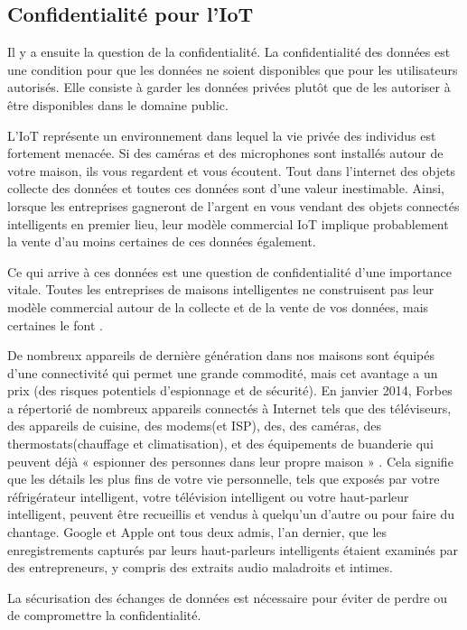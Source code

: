 \subsection{Conf{\kern0pt}identialité pour l’IoT}
Il y a ensuite la question de la conf{\kern0pt}identialité. La conf{\kern0pt}identialité des données est une condition pour que les données ne soient disponibles que pour les utilisateurs autorisés. Elle consiste à garder les données privées plutôt que de les autoriser à être disponibles dans le domaine public.


L’IoT représente un environnement dans lequel la vie privée des individus est fortement menacée. Si des caméras et des microphones sont installés autour de votre maison, ils vous regardent et vous écoutent. Tout dans l'internet des objets collecte des données et toutes ces données sont d’une valeur inestimable. Ainsi, lorsque les entreprises gagneront de l'argent en vous vendant des objets connectés intelligents en premier lieu, leur modèle commercial IoT implique probablement la vente d'au moins certaines de ces données également.


Ce qui arrive à ces données est une question de conf{\kern0pt}identialité d'une importance vitale. Toutes les entreprises de maisons intelligentes ne construisent pas leur modèle commercial autour de la collecte et de la vente de vos données, mais certaines le font \cite{ranger2020iot}.


De nombreux appareils de dernière génération dans nos maisons sont équipés d'une connectivité qui permet une grande commodité, mais cet avantage a un prix (des risques potentiels d'espionnage et de sécurité). En janvier 2014, Forbes a répertorié de nombreux appareils connectés à Internet tels que des téléviseurs, des appareils de cuisine, des modems(et ISP), des, des caméras, des thermostats(chauf{\kern0pt}fage et climatisation), et des équipements de buanderie qui peuvent déjà « espionner des personnes dans leur propre maison » \cite{steinberg2014spying}. Cela signif{\kern0pt}ie que les détails les plus f{\kern0pt}ins de votre vie personnelle, tels que exposés par votre réfrigérateur intelligent, votre télévision intelligent ou votre haut-parleur intelligent, peuvent être recueillis et vendus à quelqu'un d'autre ou pour faire du chantage. Google et Apple ont tous deux admis, l'an dernier, que les enregistrements capturés par leurs haut-parleurs intelligents étaient examinés par des entrepreneurs, y compris des extraits audio maladroits et intimes.


La sécurisation des échanges de données est nécessaire pour éviter de perdre ou de compromettre la conf{\kern0pt}identialité.
